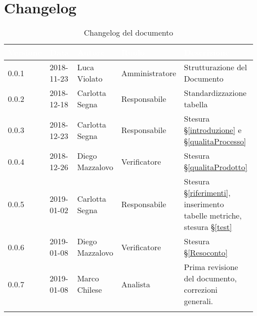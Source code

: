 \section{Changelog}

\begin{center}
\begin{longtable}[c]{|m{}|m{}|m{}|m{}|p{}|}
\hline
\rowcolor{bluelogo}\textbf{\textcolor{white}{Versione}} & \textbf{\textcolor{white}{Data}} & \textbf{\textcolor{white}{Autore}} & \textbf{\textcolor{white}{Ruolo}} & \textbf{\textcolor{white}{Descrizione}}\\
\hline \hline
\endfirsthead
0.0.1 & 2018-11-23 & Luca Violato & Amministratore & Strutturazione del Documento \\
\hline
\rowcolor{grigio} 0.0.2 & 2018-12-18 & Carlotta Segna & Responsabile & Standardizzazione tabella \\
\hline
0.0.3 & 2018-12-23 & Carlotta Segna & Responsabile & Stesura §\ref{introduzione} e §\ref{qualitaProcesso} \\
\hline
\rowcolor{grigio} 0.0.4 & 2018-12-26 & Diego Mazzalovo & Verificatore & Stesura §\ref{qualitaProdotto} \\
\hline
0.0.5 & 2019-01-02 & Carlotta Segna & Responsabile & Stesura §\ref{riferimenti}, inserimento tabelle metriche, stesura §\ref{test} \\
\hline
\rowcolor{grigio}0.0.6 & 2019-01-08 & Diego Mazzalovo & Verificatore & Stesura §\ref{Resoconto}\\
\hline
0.0.7 & 2019-01-08 & Marco Chilese & Analista & Prima revisione del documento, correzioni generali.\\
\hline
\caption{Changelog del documento}
\end{longtable}
\end{center}